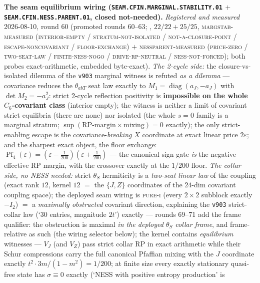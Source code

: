 \documentclass[11pt,a4paper]{article}
\begin{document}
\par\smallskip\noindent\textbf{The seam equilibrium wiring
(\texttt{SEAM.CFIN.MARGINAL.\allowbreak STABILITY.01} $+$
\texttt{SEAM.CFIN.NESS.\allowbreak PARENT.01}, closed
not-needed).}
{\sloppy
\emph{Registered and measured} 2026-08-10, round 60 (promoted
rounds 60--63; ,
$22/22 + 25/25$, \textsc{margstab-measured (interior-empty /
stratum-not-isolated / not-a-closure-point /
escape-noncovariant / floor-exchange)} $+$
\textsc{nessparent-measured (price-zero / two-seat-law /
finite-ness-nogo / drive-rp-neutral / ness-not-forced)}; both
probes exact-arithmetic, embedded byte-exact).
\emph{The 2-cycle side:} the closure-vs-isolated dilemma of the
\texttt{v903} marginal witness is refuted \emph{as a dilemma}
--- covariance reduces the $\theta_{abT}$ seat law exactly to
$M_1 = \operatorname{diag}(a_J, -a_J)$ with
$\det M_2 = -a_J^2$: strict 2-cycle reflection positivity is
\textbf{impossible on the whole $C_6$-covariant class}
(interior empty); the witness is neither a limit of covariant
strict equilibria (there are none) nor isolated (the whole
$s = 0$ family is a marginal stratum;
$\sup(\text{RP-margin} \times \text{mixing}) = 0$ exactly); the
only strict-enabling escape is the covariance-\emph{breaking}
$X$ coordinate at exact linear price $2\varepsilon$; and the
sharpest exact object, the floor exchange:
$\operatorname{Pf}_4(\varepsilon) = (\varepsilon -
\tfrac1{200})(\varepsilon + \tfrac1{200})$ --- the canonical
sign gate \emph{is} the negative effective RP margin, with the
crossover exactly at the $1/200$ floor.  \emph{The collar side,
no NESS needed:} strict $\theta_S$ hermiticity is a
\emph{two-seat linear law} of the coupling (exact rank $12$,
kernel $12$ $=$ the $\{J, Z\}$ coordinates of the $24$-dim
covariant coupling space); the deployed seam wiring is
\textsc{pure-i} (every $2\times2$ subblock exactly $-I_2$) $=$
a \emph{maximally obstructed} covariant direction, explaining
the \texttt{v903} strict-collar law (`$30$ entries, magnitude
$2t$') exactly --- rounds 69--71 add the frame qualifier: the
obstruction is maximal \emph{in the deployed $\theta_S$ collar
frame}, and frame-relative as such (the wiring selector below);
the kernel contains \emph{equilibrium}
witnesses --- $V_J$ (and $V_Z$) pass strict collar RP in exact
arithmetic while their Schur compressions carry the full
canonical Pfaffian mixing with the $J$ coordinate exactly
$t^2 \cdot 3m/(1-m^2) = 1/200$; at finite size every exactly
stationary quasi-free state has $\sigma \equiv 0$ exactly
(`NESS with positive entropy production' is
}
\end{document}
